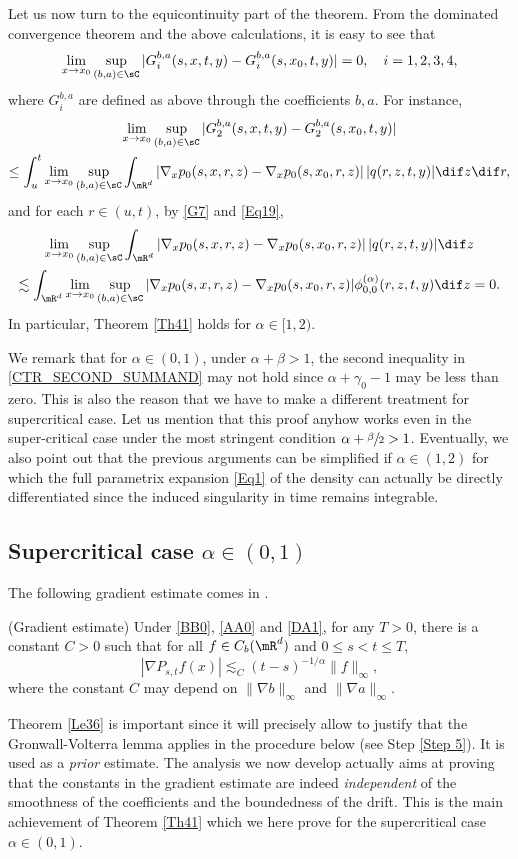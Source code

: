 {Let us now turn to the equicontinuity part of the theorem. From}
the dominated convergence theorem {and} the above calculations,
it is easy to see that
\[
\lim_{x\to x_0}\sup_{(b,a)\in\sC}|G_i^{b,a}(s,x,t,y)-G_i^{b,a}(s,x_0,t,y)|=0,\quad i=1,2,3,4,
\]
where $G_i^{b,a}$ are defined as above through the coefficients $b,a$. For instance,
\begin{multline*}
\lim_{x\to x_0}\sup_{(b,a)\in\sC}|G_2^{b,a}(s,x,t,y)-G_2^{b,a}(s,x_0,t,y)|\\
\leq\int_{u}^{t}\lim_{x\to x_0} \sup_{(b,a)\in\sC}\int_{\mR^d}|\nabla_x {p}_0(s,x,r,z)-\nabla_x {p}_0(s,x_0,r,z)|\,|q(r,z,t,y)|\dif z \dif r,
\end{multline*}
and for each $r\in(u,t)$, by \eqref{G7} and \eqref{Eq19},
\begin{multline*}
\lim_{x\to x_0} \sup_{(b,a)\in\sC}\int_{\mR^d}|\nabla_x {p}_0(s,x,r,z)-\nabla_x {p}_0(s,x_0,r,z)|\,|q(r,z,t,y)|\dif z\\
\lesssim\int_{\mR^d}\lim_{x\to x_0} \sup_{(b,a)\in\sC}|\nabla_x {p}_0(s,x,r,z)-\nabla_x {p}_0(s,x_0,r,z)|\phi^{(\alpha)}_{0,0}(r,z,t,y)\dif z=0.
\end{multline*}
In particular, Theorem \ref{Th41} holds for $\alpha\in[1,2)$.
\begin{remark}
We remark that for $\alpha\in(0,1)$, under $\alpha+\beta>1$, the second inequality in \eqref{CTR_SECOND_SUMMAND}
may not hold since $\alpha+\gamma_0-1$ may be less than zero.
This is also the reason that we have to make a different treatment for supercritical case.
Let us mention that this proof anyhow works even in the super-critical case under the most stringent condition $\alpha+\sfrac \beta 2>1 $. Eventually, we also point out that the previous arguments can be simplified if $\alpha\in (1,2)$ for which the full parametrix expansion \eqref{Eq1} of the density can actually be directly differentiated since the induced singularity in time remains integrable.
\end{remark}
\subsection{Supercritical case $\alpha\in(0,1)$}
The following gradient estimate comes in \cite{Wa-Xu-Zh}.
\begin{theorem}\label{Le36}
(Gradient estimate) Under \eqref{BB0}, \eqref{AA0} and \eqref{DA1},
for any $T>0$,
there is a constant $C>0$ such that
for all $f\in C_b(\mR^d)$
and $0\leq s<t\leq T$,
\[
|\nabla P_{s,t}f(x)|\lesssim_C (t-s)^{-1/\alpha}\|f\|_\infty,
\]
where the constant $C$ may depend on $\|\nabla b\|_\infty$ and $\|\nabla a\|_\infty$.
\end{theorem}
{Theorem \ref{Le36} is important since it will precisely allow to justify that the Gronwall-Volterra lemma applies in the procedure below (see Step \ref{Step 5}). It is used as a \textit{prior} estimate. The analysis we now develop actually aims at proving that the constants in the gradient estimate are indeed \emph{independent} of the smoothness of the coefficients {and the boundedness of the drift}. This is the main achievement of Theorem \ref{Th41} which we here prove for the supercritical case $\alpha\in (0,1) $}.

